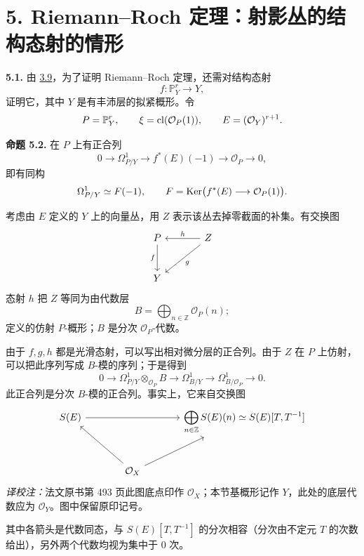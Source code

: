 \section*{5. Riemann--Roch 定理：射影丛的结构态射的情形}

\textbf{5.1.} 由 \hyperlink{sga6.e08.para.3-9}{3.9}，为了证明 Riemann--Roch 定理，还需对结构态射
\[
f:\mathbb P^r_Y\longrightarrow Y,
\]
证明它，其中 \(Y\) 是有丰沛层的拟紧概形。令
\[
P=\mathbb P^r_Y,\qquad \xi=\operatorname{cl}(\mathcal O_P(1)),\qquad E=(\mathcal O_Y)^{r+1}.
\]

\textbf{命题 5.2.} 在 \(P\) 上有正合列
\[
0\longrightarrow\Omega^1_{P/Y}\longrightarrow f^*(E)(-1)\longrightarrow\mathcal O_P\longrightarrow0,
\]
即有同构
\[
\Omega^1_{P/Y}\simeq F(-1),
\qquad
F=\operatorname{Ker}\bigl(f^*(E)\longrightarrow\mathcal O_P(1)\bigr).
\]

考虑由 \(E\) 定义的 \(Y\) 上的向量丛，用 \(Z\) 表示该丛去掉零截面的补集。有交换图
\[
\begin{tikzcd}[column sep=large,row sep=large]
P \arrow[d,"f"'] & Z \arrow[l,"h"'] \arrow[dl,"g"]\\
Y &
\end{tikzcd}
\]
态射 \(h\) 把 \(Z\) 等同为由代数层
\[
B=\bigoplus_{n\in\mathbb Z}\mathcal O_P(n);
\]
定义的仿射 \(P\)-概形；\(B\) 是分次 \(\mathcal O_P\)-代数。

由于 \(f,g,h\) 都是光滑态射，可以写出相对微分层的正合列。由于 \(Z\) 在 \(P\) 上仿射，可以把此序列写成 \(B\)-模的序列；于是得到
\begin{equation}\tag{5.2.1}
0\longrightarrow
 \Omega^1_{P/Y}\otimes_{\mathcal O_P}B
\longrightarrow
 \Omega^1_{B/Y}
\longrightarrow
 \Omega^1_{B/\mathcal O_P}
\longrightarrow0 .
\end{equation}
此正合列是分次 \(B\)-模的正合列。事实上，它来自交换图
\[
\begin{tikzcd}[column sep=large,row sep=large]
S(E) \arrow[rr] && \displaystyle\bigoplus_{n\in\mathbb Z}S(E)(n)\simeq S(E)[T,T^{-1}]\\
& \mathcal O_X \arrow[ul] \arrow[ur] &
\end{tikzcd}
\]
\noindent\textit{译校注：}法文原书第 493 页此图底点印作 \(\mathcal O_X\)；本节基概形记作 \(Y\)，此处的底层代数应为 \(\mathcal O_Y\)。图中保留原印记号。\par
其中各箭头是代数同态，与 \(S(E)[T,T^{-1}]\) 的分次相容（分次由不定元 \(T\) 的次数给出），另外两个代数均视为集中于 \(0\) 次。

